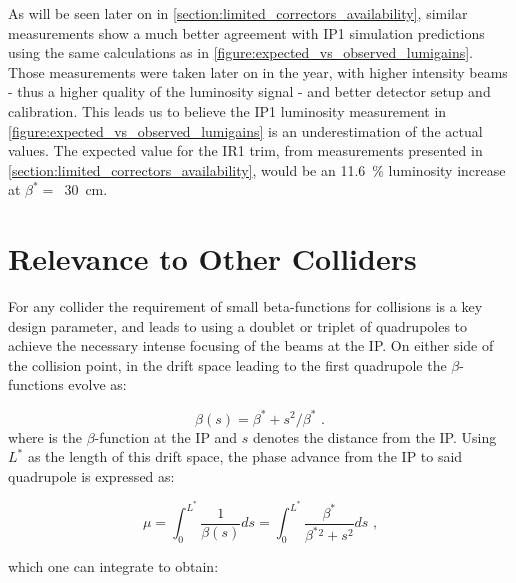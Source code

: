 \begin{warningblock}
    As will be seen later on in \cref{section:limited_correctors_availability}, similar measurements show a much better agreement with IP1 simulation predictions using the same calculations as in \cref{figure:expected_vs_observed_lumigains}. 
    Those measurements were taken later on in the year, with higher intensity beams - thus a higher quality of the \gls{luminosity} signal - and better detector setup and calibration.
    This leads us to believe the IP\num{1} luminosity measurement in \cref{figure:expected_vs_observed_lumigains} is an underestimation of the actual values.
    The expected value for the IR\num{1} trim, from measurements presented in \cref{section:limited_correctors_availability}, would be an \qty{11.6}{\percent} luminosity increase at \(\beta^{\ast} =\)~\qty{30}{\centi\meter}.
\end{warningblock}

\section{Relevance to Other Colliders}

For any collider the requirement of small \glspl{beta-function} for collisions is a key design parameter, and leads to using a doublet or triplet of quadrupoles to achieve the necessary intense focusing of the beams at the IP.
On either side of the collision point, in the drift space leading to the first quadrupole the \(\beta\)-functions evolve as:

\begin{equation}
    \beta(s) = \beta^{\ast} + s^2 / \beta^{\ast} \text{ .}
    \label{equation:collider_drift_space_beta_function}
\end{equation}
where  is the \(\beta\)-function at the \gls{IP} and \(s\) denotes the distance from the IP.
Using \(L^*\) as the length of this drift space, the phase advance from the IP to said quadrupole is expressed as:

\begin{equation}
    \mu = \int_0^{L^*} \frac{1}{\beta(s)} ds = \int_0^{L^*} \frac{\beta^{\ast}}{\beta^{\ast}{}^2 + s^2} ds \text{ ,}
    \label{equation:collider_drift_space_phase_advance_integral}
\end{equation}
\vspace{1pt}

\noindent
which one can integrate to obtain:

